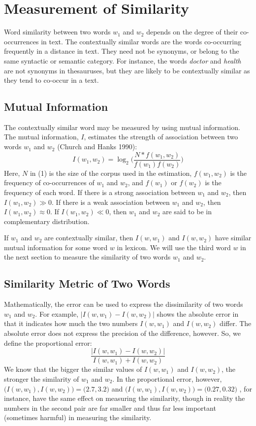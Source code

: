 \section{Measurement of Similarity}

Word similarity between two words $w_1$ and $w_2$  depends on the degree of their co-occurrences
 in text.  The contextually similar words are the words co-occurring frequently in a distance 
in text.  They need not be synonyms, or belong to the same syntactic or semantic category.  
For instance, the words {\it doctor} and {\it health} are not synonyms in 
thesauruses, but they are 
likely to be contextually similar as they tend to co-occur in a text.


\subsection{Mutual Information}

The contextually similar word may be measured by using mutual information.  The mutual
 information, $I$, estimates the strength of association between two words $w_1$  and $w_2$ 
(Church and Hanks 1990):
\begin{equation}
I(w_1,w_2)=\log_2\biggl(\frac{N\ast f(w_1,w_2)}{f(w_1)f(w_2)}\biggl)
\end{equation}
Here, $N$ in (1) is the size of the corpus used in the estimation, $f(w_1,w_2)$ is the frequency 
of co-occurrences of $w_1$ and $w_2$, and $f(w_1)$ or $f(w_2)$ is the frequency of each word.
  If there is 
a strong association between $w_1$ and $w_2$, then $I(w_1,w_2)\gg0$.  If there is a weak association 
between $w_1$ and $w_2$, then $I(w_1,w_2)\approx0$.  If $I(w_1,w_2)\ll0$, then $w_1$ and $w_2$ 
are said to be in complementary distribution.

If $w_1$ and $w_2$ are contextually similar, then $I(w,w_1)$ and $I(w,w_2)$ have similar mutual
 information 
for some word $w$ in lexicon.  We will use the third word $w$ in the next section to 
measure the similarity of two words $w_1$ and $w_2$.

\subsection{Similarity Metric of Two Words}

Mathematically, the error can be used to express the dissimilarity of two
 words $w_1$ and $w_2$.  For example, $\bigl| I(w,w_1)-I(w,w_2) \bigl|$ shows the
 absolute error in that it indicates 
how much the two numbers $I(w,w_1)$ and $I(w,w_2)$ differ.  The absolute error does not express the 
precision of the difference, however.  So, we define the proportional error:
\[\frac{\bigl| I(w,w_1)-I(w,w_2) \bigl|}{I(w,w_1)+I(w,w_2)}\]
We know that the bigger the similar values of $I(w,w_1)$ and $I(w,w_2)$, the stronger the similarity
 of $w_1$  and $w_2$.  In the proportional error, however,
 $\bigl( I(w,w_1), I(w,w_2) \bigl)=\bigl( 2.7, 3.2 \bigl)$ and 
$\bigl( I(w,w_1), I(w,w_2) \bigl)=\bigl( 0.27, 0.32 \bigl)$  , for instance, have the 
same effect on measuring the similarity, though in reality the numbers in the second
 pair are far smaller and thus far less important (sometimes harmful) in measuring 
the similarity.

